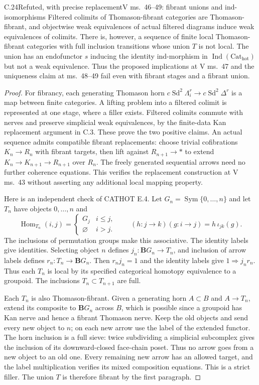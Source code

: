 \begin{claim}{C.24}{Refuted, with precise replacement}{V ms.~46--49: fibrant unions and ind-isomorphisms}
Filtered colimits of Thomason-fibrant categories are
Thomason-fibrant, and objectwise weak equivalences of actual
filtered diagrams induce weak equivalences of colimits. There is,
however, a sequence of finite local Thomason-fibrant categories
with full inclusion transitions whose union $T$ is not local.
The union has an endofunctor $s$ inducing the identity ind-morphism
in $\operatorname{Ind}(\mathrm{Cat}_{\mathrm{hot}})$ but not a
weak equivalence. Thus the proposed implications at V ms.~47 and
the uniqueness claim at ms.~48--49 fail even with fibrant stages
and a fibrant union.
\end{claim}
\begin{proof}
For fibrancy, each generating Thomason horn
$c\operatorname{Sd}^2\Lambda_i^r\to
c\operatorname{Sd}^2\Delta^r$ is a map between finite categories.
A lifting problem into a filtered colimit is represented at one
stage, where a filler exists. Filtered colimits commute with nerves
and preserve simplicial weak equivalences, by the finite-data Kan
replacement argument in C.3. These prove the two positive claims.
An actual sequence admits compatible fibrant replacements:
choose trivial cofibrations $K_n\to R_n$ with fibrant targets,
then lift against $R_{n+1}\to *$ to extend
$K_n\to K_{n+1}\to R_{n+1}$ over $R_n$.
The freely generated sequential arrows need no further coherence
equations. This verifies the replacement construction at V ms.~43
without asserting any additional local mapping property.

Here is an independent check of CATHOT E.4. Let
$G_n=\operatorname{Sym}\{0,\ldots,n\}$ and let $T_n$ have
objects $0,\ldots,n$ and
\[
 \operatorname{Hom}_{T_n}(i,j)=
 \begin{cases}G_j&i\leq j,\\\varnothing&i>j.\end{cases}
 \qquad (h:j\to k)(g:i\to j)=h\,\iota_{jk}(g).
\]
The inclusions of permutation groups make this associative.
The identity labels give identities. Selecting object $n$ defines
$j_n:\mathbf B G_n\to T_n$, and inclusion of arrow labels
defines $r_n:T_n\to\mathbf B G_n$. Then $r_nj_n=1$ and the
identity labels give $1\Rightarrow j_nr_n$. Thus each $T_n$
is local by its specified categorical homotopy equivalence to a
groupoid. The inclusions $T_n\subset T_{n+1}$ are full.

Each $T_n$ is also Thomason-fibrant. Given a generating horn
$A\subset B$ and $A\to T_n$, extend its composite to
$\mathbf B G_n$ across $B$, which is possible since a groupoid
has Kan nerve and hence a fibrant Thomason nerve. Keep the old
objects and send every new object to $n$; on each new arrow use
the label of the extended functor. The horn inclusion is a full
sieve: twice subdividing a simplicial subcomplex gives the
inclusion of its downward-closed face-chain poset. Thus no arrow
goes from a new object to an old one. Every remaining new arrow
has an allowed target, and the label multiplication verifies its
mixed composition equations. This is a strict filler. The union
$T$ is therefore fibrant by the first paragraph.


\end{proof}
